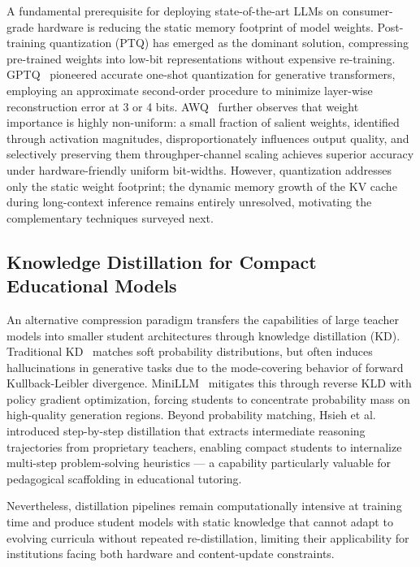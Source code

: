 \documentclass[10pt,conference]{IEEEtran}
\begin{document}
A fundamental prerequisite for deploying state-of-the-art LLMs on consumer-grade hardware is reducing the static memory footprint of model weights. Post-training quantization (PTQ) has emerged as the dominant solution, compressing pre-trained weights into low-bit representations without expensive re-training. GPTQ~\cite{frantar2023gptq} pioneered accurate one-shot quantization for generative transformers, employing an approximate second-order procedure to minimize layer-wise reconstruction error at 3 or 4 bits. AWQ~\cite{lin2024awq} further observes that weight importance is highly non-uniform: a small fraction of salient weights, identified through activation magnitudes, disproportionately influences output quality, and selectively preserving them throughper-channel scaling achieves superior accuracy under hardware-friendly uniform bit-widths. However, quantization addresses only the static weight footprint; the dynamic memory growth of the KV cache during long-context inference remains entirely unresolved, motivating the complementary techniques surveyed next.

\subsection{Knowledge Distillation for Compact Educational Models}
\label{subsec:distillation}

An alternative compression paradigm transfers the capabilities of large 
teacher models into smaller student architectures through knowledge 
distillation (KD). Traditional KD~\cite{hinton2015distilling} matches 
soft probability distributions, but often induces hallucinations in 
generative tasks due to the mode-covering behavior of forward 
Kullback-Leibler divergence. MiniLLM~\cite{gu2024minillm} mitigates 
this through reverse KLD with policy gradient optimization, forcing 
students to concentrate probability mass on high-quality generation 
regions. Beyond probability matching, Hsieh et al.~\cite{hsieh2023distilling} 
introduced step-by-step distillation that extracts intermediate reasoning 
trajectories from proprietary teachers, enabling compact students to 
internalize multi-step problem-solving heuristics --- a capability 
particularly valuable for pedagogical scaffolding in educational tutoring.

Nevertheless, distillation pipelines remain computationally intensive 
at training time and produce student models with static knowledge that 
cannot adapt to evolving curricula without repeated re-distillation, 
limiting their applicability for institutions facing both hardware and 
content-update constraints.
\end{document}
